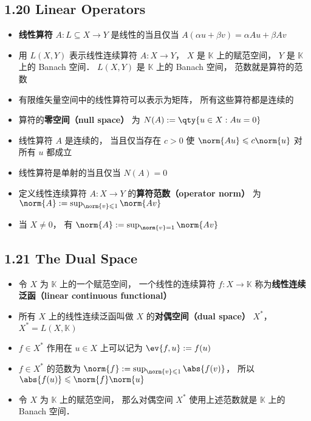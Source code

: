 \subsection{1.20 Linear Operators}
\begin{itemize}
\item \textbf{线性算符} $A: L \subseteq X\to Y$ 是线性的当且仅当 $A (\alpha u + \beta v) = \alpha Au + \beta Av$

\item 用 $L(X, Y)$ 表示线性连续算符 $A: X \to Y$， $X$ 是 $\mathbb K$ 上的赋范空间， $Y$ 是 $\mathbb K$ 上的 Banach 空间． $L(X, Y)$ 是 $\mathbb K$ 上的 Banach 空间， 范数就是算符的范数

\item 有限维矢量空间中的线性算符可以表示为矩阵， 所有这些算符都是连续的

\item 算符的\textbf{零空间（null space）} 为 $N(A) := \qty{u \in X: Au = 0}$

\item 线性算符 $A$ 是连续的， 当且仅当存在 $c > 0$ 使 $\norm{Au} \leqslant c\norm{u}$ 对所有 $u$ 都成立

\item 线性算符是单射的当且仅当 $N(A) = {0}$

\item 定义线性连续算符 $A: X \to Y$ 的\textbf{算符范数（operator norm）} 为 $\norm{A} := \sup_{\norm{v} \leqslant 1} \norm{A v}$

\item 当 $X \ne {0}$， 有 $\norm{A} := \sup_{\norm{v} = 1} \norm{A v}$
\end{itemize}

\subsection{1.21 The Dual Space}

\begin{itemize}
\item 令 $X$ 为 $\mathbb K$ 上的一个赋范空间， 一个线性的连续算符 $f: X \to \mathbb K$ 称为\textbf{线性连续泛函（linear continuous functional）}

\item 所有 $X$ 上的线性连续泛函叫做 $X$ 的\textbf{对偶空间（dual space）} $X^*$， $X^* = L(X, \mathbb K)$

\item $f \in X^*$ 作用在 $u \in X$ 上可以记为 $\ev{f, u} := f(u)$

\item $f\in X^*$ 的范数为 $\norm{f} := \sup_{\norm{v} \leqslant 1} \abs{f(v)}$， 所以 $\abs{f(u)} \leqslant \norm{f}\norm{u}$

\item 令 $X$ 为 $\mathbb K$ 上的赋范空间， 那么对偶空间 $X^*$ 使用上述范数就是 $\mathbb K$ 上的 Banach 空间．
\end{itemize}

